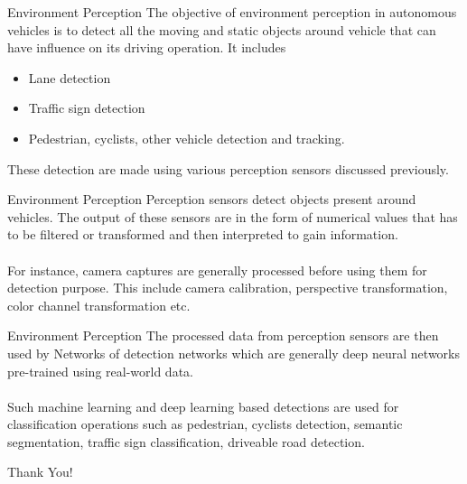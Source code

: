 \documentclass{beamer}
\begin{document}
\begin{frame}
\end{frame}
\begin{frame}{Environment Perception}
The objective of environment perception in autonomous vehicles is to detect all the moving and static objects around vehicle that can have influence on its driving operation. It includes
\begin{itemize}
    \item Lane detection
    \item Traffic sign detection
    \item Pedestrian, cyclists, other vehicle detection and tracking.
\end{itemize}
These detection are made using various perception sensors discussed previously.

\end{frame}

\begin{frame}{Environment Perception}
    Perception sensors detect objects present around vehicles. The output of these sensors are in the form of numerical values that has to be filtered or transformed and then interpreted to gain information.\\~\\
    For instance, camera captures are generally processed before using them for detection purpose. This include camera calibration, perspective transformation, color channel transformation etc. 
    
\end{frame}
\begin{frame}{Environment Perception}
    The processed data from perception sensors are then used by Networks of detection networks which are generally deep neural networks pre-trained using real-world data.\\~\\
    Such machine learning and deep learning based detections are used for classification operations such as pedestrian, cyclists detection, semantic segmentation, traffic sign classification, driveable road detection.
\end{frame}

%	




\begin{frame}
	\begin{center}
		\Huge Thank You!
	\end{center}
\end{frame}
\end{document}

